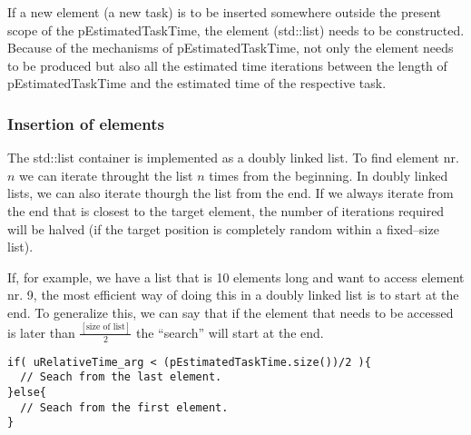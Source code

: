 
	If a new element (a new task) is to be inserted somewhere outside the present scope of the pEstimatedTaskTime, the element (std::list) needs to be constructed.
	Because of the mechanisms of pEstimatedTaskTime, not only the element needs to be produced but also all the estimated time iterations between the length of pEstimatedTaskTime and the estimated time of the respective task.

	
	\subsubsection{Insertion of elements}
	The std::list container is implemented as a doubly linked list\cite{Stroustrup2000KAP16}.
	To find element nr. $n$ we can iterate throught the list $n$ times from the beginning.
	In doubly linked lists, we can also iterate thourgh the list from the end.
	If we always iterate from the end that is closest to the target element, the number of iterations required will be halved (if the target position is completely random within a fixed--size list).

	If, for example, we have a list that is 10 elements long and want to access element nr. 9, the most efficient way of doing this in a doubly linked list is to start at the end.
	To generalize this, we can say that if the element that needs to be accessed is later than $\frac{[\text{size of list}]}{2}$ the ``search'' will start at the end.

\begin{lstlisting}
if( uRelativeTime_arg < (pEstimatedTaskTime.size())/2 ){
  // Seach from the last element.
}else{
  // Seach from the first element.
}
\end{lstlisting}


